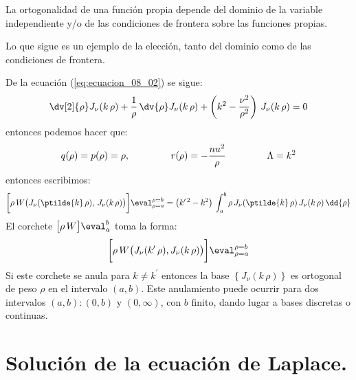 La ortogonalidad de una función propia depende del dominio de la variable independiente y/o de las condiciones de frontera sobre las funciones propias.
\par
Lo que sigue es un ejemplo de la elección, tanto del dominio como de las condiciones de frontera.
\par
De la ecuación (\ref{eq:ecuacion_08_02}) se sigue:
\begin{align*}
\dv[2]{\rho} J_{\nu} (k \, \rho) + \dfrac{1}{\rho} \, \dv{\rho} J_{\nu} (k \, \rho) + \left( k^{2} - \dfrac{\nu^{2}}{\rho^{2}} \right) \, J_{\nu} (k \, \rho) = 0
\end{align*}
entonces podemos hacer que:
\begin{align*}
q(\rho) = p(\rho) = \rho, \hspace{1.5cm} r(\rho) = -\dfrac{nu^{2}}{\rho} \hspace{1.5cm} \Lambda = k^{2}
\end{align*}
entonces escribimos:
\begin{align}
\bigg[ \rho \, W \big( J_{\nu}(\ptilde{k} \, \rho), \, J_{\nu} (k \, \rho) \big) \bigg]\eval_{\rho=a}^{\rho=b} = \big( k^{\prime \, 2} - k^{2} \big) \, \int_{a}^{b} \rho \, J_{\nu}(\ptilde{k} \, \rho) \, J_{\nu} (k \, \rho) \, \dd{\rho}
\label{eq:ecuacion_08_12}
\end{align}
El corchete $\big[ \rho \, W \big]\eval_{a}^{b}$ toma la forma:
\begin{align*}
\bigg[ \rho \, W \big( J_{\nu}(k^{\prime} \, \rho), J_{\nu} (k \, \rho) \big) \bigg]\eval_{\rho=a}^{\rho=b}
\end{align*}
Si este corchete se anula para $k \neq k^{\prime}$ entonces la base $\left\{ J_{\nu} (k \, \rho) \right\}$ es ortogonal de peso $\rho$ en el intervalo $(a,b)$. Este anulamiento puede ocurrir para dos intervalos $(a,b): (0, b)$ y $(0, \infty)$, con $b$ finito, dando lugar a bases discretas o continuas.

\section{Solución de la ecuación de Laplace.}

